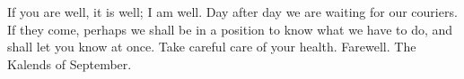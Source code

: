 

If you are well, it is well; I am well. Day after day we are waiting for our couriers. If they come, perhaps we shall be in a position to know what we have to do, and shall let you know at once. Take careful care of your health. Farewell. The Kalends of September.
